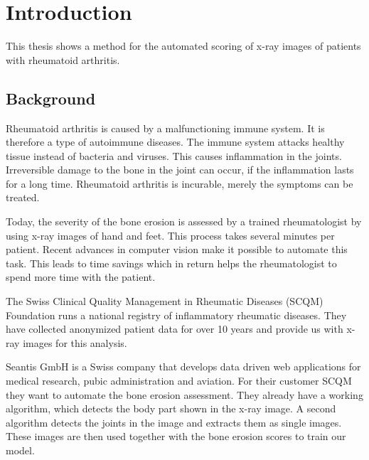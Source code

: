 \documentclass[12pt]{article}
\begin{document}
\newpage

\tableofcontents

\newpage

\section{Introduction}

This thesis shows a method for the automated scoring of x-ray images of patients with rheumatoid arthritis. 

\subsection{Background}

Rheumatoid arthritis is caused by a malfunctioning immune system. It is therefore a type of autoimmune diseases. The immune system attacks healthy tissue instead of bacteria and viruses. This causes inflammation in the joints. Irreversible damage to the bone in the joint can occur, if the inflammation lasts for a long time. \cite{rheuma} Rheumatoid arthritis is incurable, merely the symptoms can be treated.

Today, the severity of the bone erosion is assessed by a trained rheumatologist by using x-ray images of hand and feet. This process takes several minutes per patient. Recent advances in computer vision make it possible to automate this task. This leads to time savings which in return helps the rheumatologist to spend more time with the patient.

The Swiss Clinical Quality Management in Rheumatic Diseases (SCQM) Foundation runs a national registry of inflammatory rheumatic diseases. \cite{scqm_about} They have collected anonymized patient data for over 10 years and provide us with x-ray images for this analysis.

Seantis GmbH is a Swiss company that develops data driven web applications for medical research, pubic administration and aviation. \cite{seantis_about} For their customer SCQM they want to automate the bone erosion assessment. They already have a working algorithm, which detects the body part shown in the x-ray image. A second algorithm detects the joints in the image and extracts them as single images. These images are then used together with the bone erosion scores to train our model.

\end{document}
